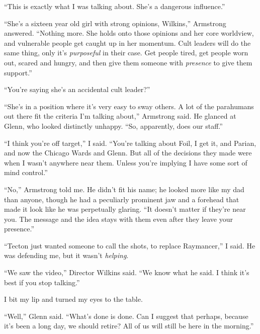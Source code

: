 





``This is exactly what I was talking about.  She's a dangerous influence.''



``She's a sixteen year old girl with strong opinions, Wilkins,'' Armstrong answered.  ``Nothing more.  She holds onto those opinions and her core worldview, and vulnerable people get caught up in her momentum.  Cult leaders will do the same thing, only it's \emph{purposeful} in their case.  Get people tired, get people worn out, scared and hungry, and then give them someone with \emph{presence} to give them support.''



``You're saying she's an accidental cult leader?''



``She's in a position where it's very easy to sway others.  A lot of the parahumans out there fit the criteria I'm talking about,'' Armstrong said.  He glanced at Glenn, who looked distinctly unhappy.  ``So, apparently, does our staff.''



``I think you're off target,'' I said.  ``You're talking about Foil, I get it, and Parian, and now the Chicago Wards and Glenn.  But all of the decisions they made were when I wasn't anywhere near them.  Unless you're implying I have some sort of mind control.''



``No,'' Armstrong told me.  He didn't fit his name; he looked more like my dad than anyone, though he had a peculiarly prominent jaw and a forehead that made it look like he was perpetually glaring.  ``It doesn't matter if they're near you.  The message and the idea stays with them even after they leave your presence.''



``Tecton just wanted someone to call the shots, to replace Raymancer,'' I said.  He was defending me, but it wasn't \emph{helping}.



``We saw the video,'' Director Wilkins said.  ``We know what he said.  I think it's best if you stop talking.''



I bit my lip and turned my eyes to the table.



``Well,'' Glenn said.  ``What's done is done.  Can I suggest that perhaps, because it's been a long day, we should retire?  All of us will still be here in the morning.''



